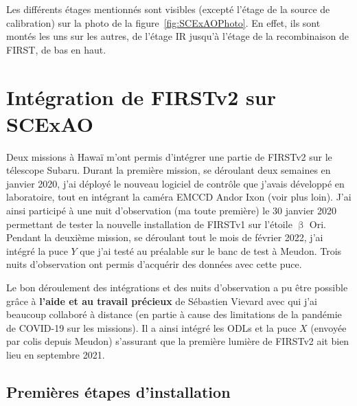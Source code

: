 Les différents étages mentionnés sont visibles (excepté l'étage de la source de calibration) sur la photo de la figure~\ref{fig:SCExAOPhoto}. En effet, ils sont montés les uns sur les autres, de l'étage \ac{IR} jusqu'à l'étage de la recombinaison de \ac{FIRST}, de bas en haut.


\section{Intégration de FIRSTv2 sur SCExAO}

Deux missions à Hawaï m'ont permis d'intégrer une partie de \ac{FIRSTv2} sur le télescope Subaru. Durant la première mission, se déroulant deux semaines en janvier 2020, j'ai déployé le nouveau logiciel de contrôle que j'avais développé en laboratoire, tout en intégrant la caméra \ac{EMCCD} Andor Ixon (voir plus loin). J'ai ainsi participé à une nuit d'observation (ma toute première) le 30 janvier 2020 permettant de tester la nouvelle installation de \ac{FIRSTv1} sur l'étoile $\upbeta$ Ori. Pendant la deuxième mission, se déroulant tout le mois de février 2022, j'ai intégré la puce $Y$ que j'ai testé au préalable sur le banc de test à Meudon. Trois nuits d'observation ont permis d'acquérir des données avec cette puce.

Le bon déroulement des intégrations et des nuits d'observation a pu être possible grâce à \textbf{l'aide et au travail précieux} de Sébastien Vievard avec qui j'ai beaucoup collaboré à distance (en partie à cause des limitations de la pandémie de COVID-19 sur les missions). Il a ainsi intégré les \acrshort{ODL}s et la puce $X$ (envoyée par colis depuis Meudon) s'assurant que la première lumière de \ac{FIRSTv2} ait bien lieu en septembre 2021.


\subsection{Premières étapes d'installation}
\label{sec:V1V2Integration}

